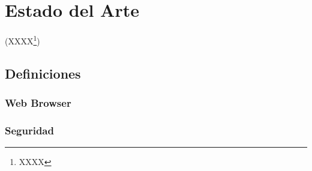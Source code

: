 \chapter{Estado del Arte}
\label{chap:chap2}

(XXXX\footnote{XXXX})

\section{Definiciones}
\label{sec:chap2.1}





\subsection{Web Browser}
\label{sec:chap2.1.1}

%

\subsection{Seguridad}
\label{sec:chap2.1.2}
%




%
